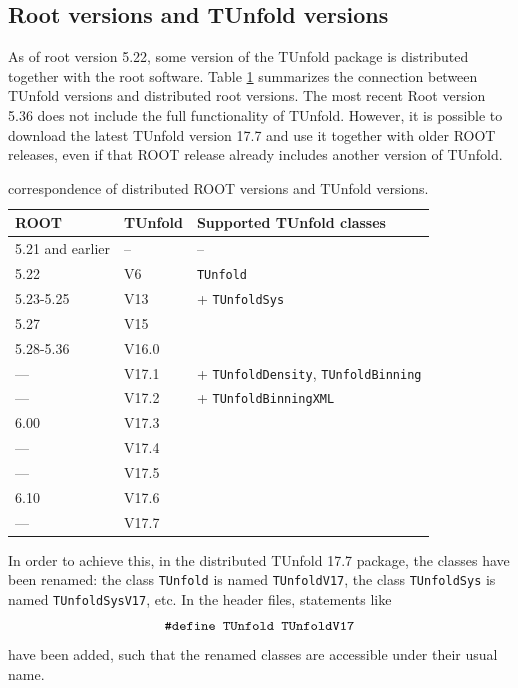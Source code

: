 \documentclass[12pt]{article}
\newcommand{\tunfoldmajor}{17}
\newcommand{\tunfoldminor}{7}
\newcommand{\tunfoldversion}{{\tunfoldmajor{}.\tunfoldminor}}
\begin{document}
\subsection{Root versions and TUnfold versions}

As of root version 5.22, some version of the TUnfold package is
distributed together with the root software. Table
\ref{tab:rootversion} summarizes the connection between TUnfold
versions and distributed root versions.
The most recent Root version 5.36 does not include the full
functionality of TUnfold.
However, it is possible to download the latest TUnfold version
\tunfoldversion{} and use
it together with older ROOT releases, even if that ROOT release
already includes another version of TUnfold.
\begin{table}[h]
\centering
\begin{tabular}{l|l|l}
ROOT & TUnfold & Supported TUnfold classes \\
\hline
5.21 and earlier & -- & -- \\
5.22 & V6 & {\tt TUnfold} \\
5.23-5.25 & V13 & + {\tt TUnfoldSys} \\
5.27 & V15 & \\ %
5.28-5.36 & V16.0 & \\%
---  & V17.1 & + {\tt TUnfoldDensity}, {\tt TUnfoldBinning} \\
--- & V17.2 & + {\tt TUnfoldBinningXML}\\
6.00 & V17.3 & \\
--- & V17.4 & \\
--- & V17.5 & \\
6.10 & V17.6 & \\
--- & V17.7 & \\
\hline
\end{tabular}
\caption{\label{tab:rootversion}correspondence of distributed ROOT versions and TUnfold versions.}
\end{table}
In order to achieve this, in the distributed TUnfold \tunfoldversion{}
package, the classes have been renamed: 
the class {\tt TUnfold} is named {\tt TUnfoldV\tunfoldmajor}, the
class {\tt TUnfoldSys} is named {\tt TUnfoldSysV\tunfoldmajor},
etc. In the header files, statements like
%
\begin{equation*}
\text{\tt \#define TUnfold TUnfoldV\tunfoldmajor}
\end{equation*}
%
have been added, such that the renamed classes are accessible under
their usual name.
\end{document}

